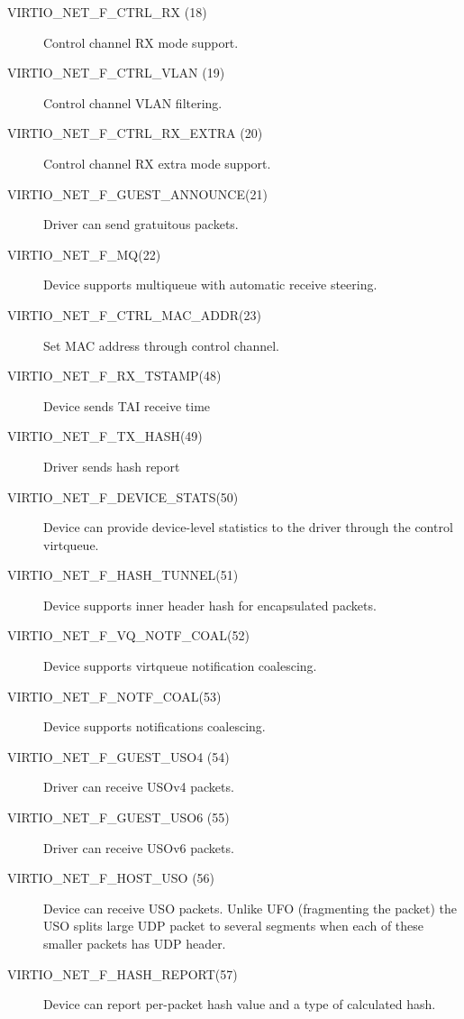 \begin{description}
\item[VIRTIO_NET_F_CTRL_RX (18)] Control channel RX mode support.

\item[VIRTIO_NET_F_CTRL_VLAN (19)] Control channel VLAN filtering.

\item[VIRTIO_NET_F_CTRL_RX_EXTRA (20)]	Control channel RX extra mode support.

\item[VIRTIO_NET_F_GUEST_ANNOUNCE(21)] Driver can send gratuitous
    packets.

\item[VIRTIO_NET_F_MQ(22)] Device supports multiqueue with automatic
    receive steering.

\item[VIRTIO_NET_F_CTRL_MAC_ADDR(23)] Set MAC address through control
    channel.

\item[VIRTIO_NET_F_RX_TSTAMP(48)] Device sends TAI receive time

\item[VIRTIO_NET_F_TX_HASH(49)] Driver sends hash report

\item[VIRTIO_NET_F_DEVICE_STATS(50)] Device can provide device-level statistics
    to the driver through the control virtqueue.

\item[VIRTIO_NET_F_HASH_TUNNEL(51)] Device supports inner header hash for encapsulated packets.

\item[VIRTIO_NET_F_VQ_NOTF_COAL(52)] Device supports virtqueue notification coalescing.

\item[VIRTIO_NET_F_NOTF_COAL(53)] Device supports notifications coalescing.

\item[VIRTIO_NET_F_GUEST_USO4 (54)] Driver can receive USOv4 packets.

\item[VIRTIO_NET_F_GUEST_USO6 (55)] Driver can receive USOv6 packets.

\item[VIRTIO_NET_F_HOST_USO (56)] Device can receive USO packets. Unlike UFO
 (fragmenting the packet) the USO splits large UDP packet
 to several segments when each of these smaller packets has UDP header.

\item[VIRTIO_NET_F_HASH_REPORT(57)] Device can report per-packet hash
    value and a type of calculated hash.


\end{description}
